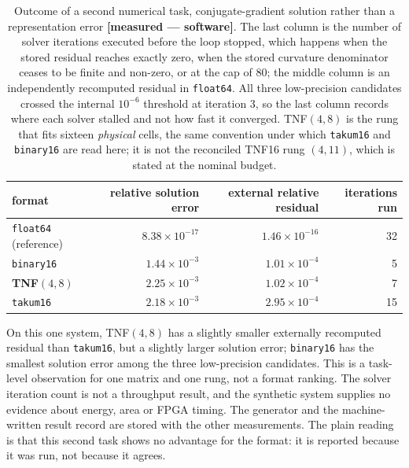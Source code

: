 \documentclass[11pt]{article}
\theoremstyle{definition}
\begin{document}
\begin{table}[t]\centering\small
\caption{Outcome of a second numerical task, conjugate-gradient solution rather
than a representation error \textbf{[measured --- software]}. The last column is
the number of solver iterations executed before the loop stopped, which happens when
the stored residual reaches exactly zero, when the stored curvature denominator
ceases to be finite and non-zero, or at the cap of $80$; the middle column is an
independently recomputed residual in \texttt{float64}. All three low-precision
candidates crossed the internal $10^{-6}$ threshold at iteration 3, so the last
column records where each solver stalled and not how fast it converged.
TNF$(4,8)$ is the rung that fits sixteen \emph{physical} cells, the same
convention under which \texttt{takum16} and \texttt{binary16} are read here; it
is not the reconciled TNF16 rung $(4,11)$, which is stated at the nominal
budget.}
\label{tab:downstream-cg}
\begin{tabular}{lrrr}
\toprule
format & relative solution error & external relative residual & iterations run \\
\midrule
\texttt{float64} (reference) & $8.38\times10^{-17}$ & $1.46\times10^{-16}$ & 32 \\
\texttt{binary16}            & $1.44\times10^{-3}$  & $1.01\times10^{-4}$  & 5  \\
\textbf{TNF$(4,8)$}          & $2.25\times10^{-3}$  & $1.02\times10^{-4}$  & 7  \\
\texttt{takum16}             & $2.18\times10^{-3}$  & $2.95\times10^{-4}$  & 15 \\
\bottomrule
\end{tabular}
\end{table}

On this one system, TNF$(4,8)$ has a slightly smaller externally recomputed residual
than \texttt{takum16}, but a slightly larger solution error; \texttt{binary16}
has the smallest solution error among the three low-precision candidates. This
is a task-level observation for one matrix and one rung, not a format ranking.
The solver iteration count is not a throughput result, and the synthetic
system supplies no evidence about energy, area or FPGA timing. The generator and
the machine-written result record are stored with the other measurements. The
plain reading is that this second task shows no advantage for the format: it is
reported because it was run, not because it agrees.
\end{document}
